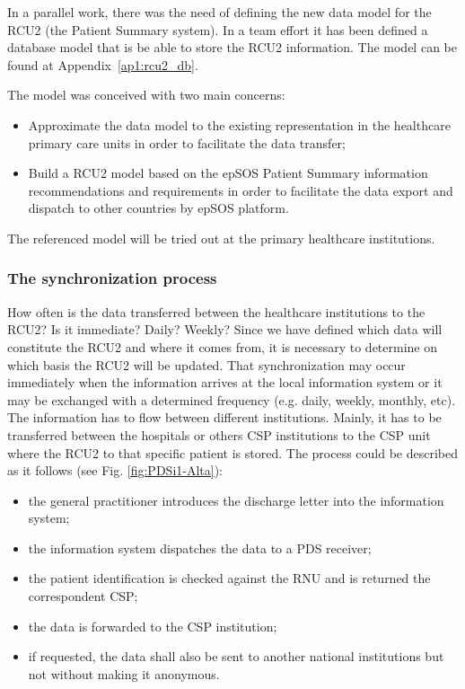 
In a parallel work, there was the need of defining the new data model for the RCU2 (the Patient Summary system). In a team effort it has been defined a database model that is be able to store the RCU2 information. The model can be found at Appendix~\ref{ap1:rcu2_db}.

The model was conceived with two main concerns:
\begin{itemize}
\item Approximate the data model to the existing representation in the healthcare primary care units in order to facilitate the data transfer;
\item Build a RCU2 model based on the epSOS Patient Summary information recommendations and requirements in order to facilitate the data export and dispatch to other countries by epSOS platform.
\end{itemize}

The referenced model will be tried out at the primary healthcare institutions.


\subsubsection{The synchronization process}

How often is the data transferred between the healthcare institutions to the RCU2? Is it immediate? Daily? Weekly? Since we have defined which data will constitute the RCU2 and where it comes from, it is necessary to determine on which basis the RCU2 will be updated. That synchronization may occur immediately when the information arrives at the local information system or it may be exchanged with a determined frequency (e.g. daily, weekly, monthly, etc).
The information has to flow between different institutions. Mainly, it has to be transferred between the hospitals or others CSP institutions to the CSP unit where the RCU2 to that specific patient is stored. The process could be described as it follows (see Fig. \ref{fig:PDSi1-Alta}):

\begin{itemize}
\item the general practitioner introduces the discharge letter into the information system;
\item the information system dispatches the data to a PDS receiver;
\item the patient identification is checked against the RNU and is returned the correspondent CSP;
\item the data is forwarded to the CSP institution;
\item if requested, the data shall also be sent to another national institutions but not without making it anonymous.
\end{itemize}

